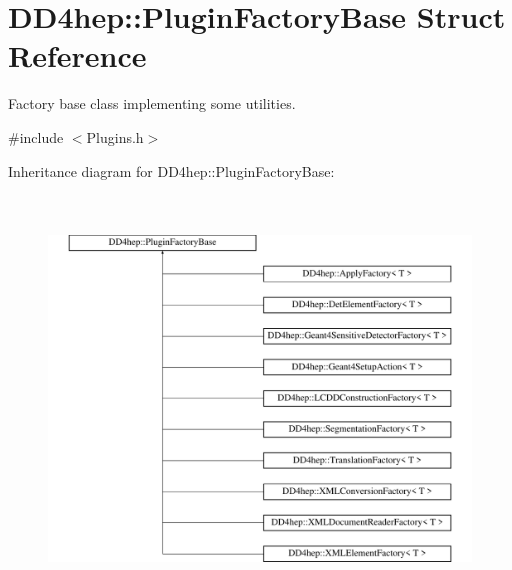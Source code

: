 \hypertarget{struct_d_d4hep_1_1_plugin_factory_base}{}\section{D\+D4hep\+:\+:Plugin\+Factory\+Base Struct Reference}
\label{struct_d_d4hep_1_1_plugin_factory_base}


Factory base class implementing some utilities.  




{\ttfamily \#include $<$Plugins.\+h$>$}

Inheritance diagram for D\+D4hep\+:\+:Plugin\+Factory\+Base\+:\begin{figure}[H]
\begin{center}
\leavevmode
\includegraphics[height=10.769231cm]{struct_d_d4hep_1_1_plugin_factory_base}
\end{center}
\end{figure}
